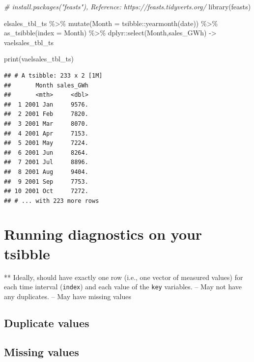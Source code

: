 \documentclass[
]{book}
\newenvironment{Shaded}{\begin{snugshade}}{\end{snugshade}}
\newcommand{\AttributeTok}[1]{\textcolor[rgb]{0.77,0.63,0.00}{#1}}
\newcommand{\CommentTok}[1]{\textcolor[rgb]{0.56,0.35,0.01}{\textit{#1}}}
\newcommand{\FunctionTok}[1]{\textcolor[rgb]{0.00,0.00,0.00}{#1}}
\newcommand{\NormalTok}[1]{#1}
\newcommand{\OtherTok}[1]{\textcolor[rgb]{0.56,0.35,0.01}{#1}}
\newcommand{\SpecialCharTok}[1]{\textcolor[rgb]{0.00,0.00,0.00}{#1}}
\begin{document}
\begin{Shaded}
\begin{Highlighting}[]
\CommentTok{\# install.packages("feasts"), Reference: https://feasts.tidyverts.org/}
\FunctionTok{library}\NormalTok{(feasts)}

\NormalTok{elsales\_tbl\_ts }\SpecialCharTok{\%\textgreater{}\%}
  \FunctionTok{mutate}\NormalTok{(}\AttributeTok{Month =}\NormalTok{ tsibble}\SpecialCharTok{::}\FunctionTok{yearmonth}\NormalTok{(date)) }\SpecialCharTok{\%\textgreater{}\%}
  \FunctionTok{as\_tsibble}\NormalTok{(}\AttributeTok{index =}\NormalTok{ Month) }\SpecialCharTok{\%\textgreater{}\%}
\NormalTok{  dplyr}\SpecialCharTok{::}\FunctionTok{select}\NormalTok{(Month,sales\_GWh) }\OtherTok{{-}\textgreater{}}\NormalTok{ vaelsales\_tbl\_ts}

\FunctionTok{print}\NormalTok{(vaelsales\_tbl\_ts)}
\end{Highlighting}
\end{Shaded}

\begin{verbatim}
## # A tsibble: 233 x 2 [1M]
##       Month sales_GWh
##       <mth>     <dbl>
##  1 2001 Jan     9576.
##  2 2001 Feb     7820.
##  3 2001 Mar     8070.
##  4 2001 Apr     7153.
##  5 2001 May     7224.
##  6 2001 Jun     8264.
##  7 2001 Jul     8896.
##  8 2001 Aug     9404.
##  9 2001 Sep     7753.
## 10 2001 Oct     7272.
## # ... with 223 more rows
\end{verbatim}

\hypertarget{running-diagnostics-on-your-tsibble}{%
\section{Running diagnostics on your tsibble}\label{running-diagnostics-on-your-tsibble}}

** Ideally, should have exactly one row (i.e., one vector of measured values) for each time interval (\texttt{index}) and each value of the \texttt{key} variables.
-- May not have any duplicates.
-- May have missing values

\hypertarget{duplicate-values}{%
\subsection{Duplicate values}\label{duplicate-values}}

\hypertarget{missing-values}{%
\subsection{Missing values}\label{missing-values}}
\end{document}
